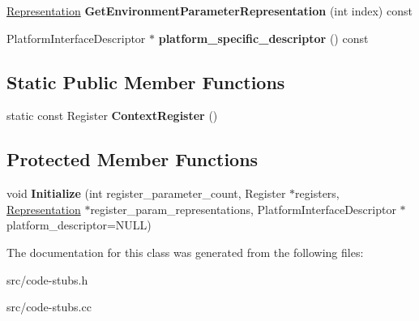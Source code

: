 \begin{DoxyCompactItemize}
\item 
\hypertarget{classv8_1_1internal_1_1_interface_descriptor_aad943b5bb29d360ee7762f5a1153914b}{}\hyperlink{classv8_1_1internal_1_1_representation}{Representation} {\bfseries Get\+Environment\+Parameter\+Representation} (int index) const \label{classv8_1_1internal_1_1_interface_descriptor_aad943b5bb29d360ee7762f5a1153914b}

\item 
\hypertarget{classv8_1_1internal_1_1_interface_descriptor_a7b33060063730abb9183d458a96ce477}{}Platform\+Interface\+Descriptor $\ast$ {\bfseries platform\+\_\+specific\+\_\+descriptor} () const \label{classv8_1_1internal_1_1_interface_descriptor_a7b33060063730abb9183d458a96ce477}

\end{DoxyCompactItemize}
\subsection*{Static Public Member Functions}
\begin{DoxyCompactItemize}
\item 
\hypertarget{classv8_1_1internal_1_1_interface_descriptor_ab1375d0e8d28f0a3414dc3a25d7837fb}{}static const Register {\bfseries Context\+Register} ()\label{classv8_1_1internal_1_1_interface_descriptor_ab1375d0e8d28f0a3414dc3a25d7837fb}

\end{DoxyCompactItemize}
\subsection*{Protected Member Functions}
\begin{DoxyCompactItemize}
\item 
\hypertarget{classv8_1_1internal_1_1_interface_descriptor_ad44f92acc76abd0d4267a9c336d0b517}{}void {\bfseries Initialize} (int register\+\_\+parameter\+\_\+count, Register $\ast$registers, \hyperlink{classv8_1_1internal_1_1_representation}{Representation} $\ast$register\+\_\+param\+\_\+representations, Platform\+Interface\+Descriptor $\ast$platform\+\_\+descriptor=N\+U\+L\+L)\label{classv8_1_1internal_1_1_interface_descriptor_ad44f92acc76abd0d4267a9c336d0b517}

\end{DoxyCompactItemize}


The documentation for this class was generated from the following files\+:\begin{DoxyCompactItemize}
\item 
src/code-\/stubs.\+h\item 
src/code-\/stubs.\+cc\end{DoxyCompactItemize}
